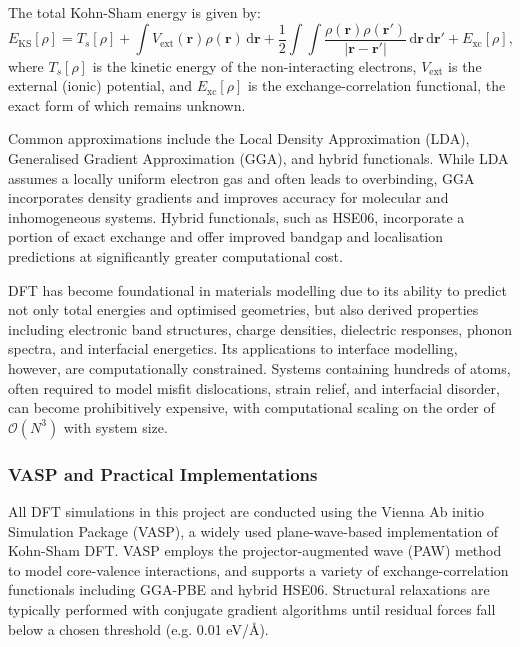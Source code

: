 The total Kohn-Sham energy is given by:
\begin{equation}
    E_{\mathrm{KS}}[\rho] = T_s[\rho] + \int V_{\mathrm{ext}}(\mathbf{r}) \rho(\mathbf{r}) \, \mathrm{d}\mathbf{r} + \frac{1}{2} \int \int \frac{\rho(\mathbf{r}) \rho(\mathbf{r'})}{|\mathbf{r} - \mathbf{r'}|} \, \mathrm{d}\mathbf{r} \, \mathrm{d}\mathbf{r'} + E_{\mathrm{xc}}[\rho],
\end{equation}
where $T_s[\rho]$ is the kinetic energy of the non-interacting electrons, $V_{\mathrm{ext}}$ is the external (ionic)
potential, and $E_{\mathrm{xc}}[\rho]$ is the exchange-correlation functional, the exact form of which remains unknown.

Common approximations include the Local Density Approximation (LDA), Generalised Gradient Approximation (GGA), and
hybrid functionals. While LDA assumes a locally uniform electron gas and often leads to overbinding, GGA
incorporates density gradients and improves accuracy for molecular and inhomogeneous systems. Hybrid functionals,
such as HSE06, incorporate a portion of exact exchange and offer improved bandgap and localisation predictions at
significantly greater computational cost.

DFT has become foundational in materials modelling due to its ability to predict not only total energies and
optimised geometries, but also derived properties including electronic band structures, charge densities, dielectric
responses, phonon spectra, and interfacial energetics. Its applications to interface modelling, however, are
computationally constrained. Systems containing hundreds of atoms, often required to model misfit dislocations,
strain relief, and interfacial disorder, can become prohibitively expensive, with computational scaling on the order
of $\mathcal{O}(N^3)$ with system size.

\subsubsection{VASP and Practical Implementations}

All DFT simulations in this project are conducted using the Vienna Ab initio Simulation Package (VASP), a widely
used plane-wave-based implementation of Kohn-Sham DFT. VASP employs the projector-augmented wave (PAW) method to
model core-valence interactions, and supports a variety of exchange-correlation functionals including GGA-PBE and
hybrid HSE06. Structural relaxations are typically performed with conjugate gradient algorithms until residual
forces fall below a chosen threshold (e.g. 0.01 eV/\AA).

